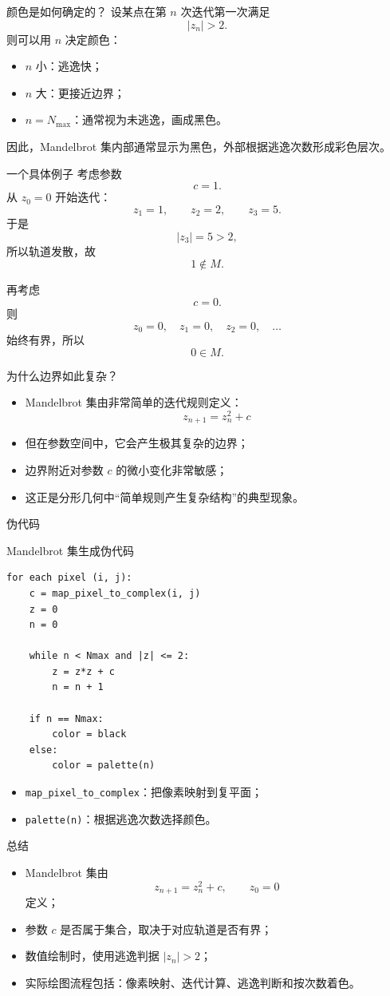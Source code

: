\documentclass[UTF8]{ctexbeamer}
\begin{document}
\begin{frame}{颜色是如何确定的？}
设某点在第 \(n\) 次迭代第一次满足
\[
|z_n|>2.
\]
则可以用 \(n\) 决定颜色：

\begin{itemize}
    \item \(n\) 小：逃逸快；
    \item \(n\) 大：更接近边界；
    \item \(n=N_{\max}\)：通常视为未逃逸，画成黑色。
\end{itemize}

\medskip
因此，Mandelbrot 集内部通常显示为黑色，外部根据逃逸次数形成彩色层次。
\end{frame}

\begin{frame}{一个具体例子}
考虑参数
\[
c=1.
\]
从 \(z_0=0\) 开始迭代：
\[
z_1=1,\qquad z_2=2,\qquad z_3=5.
\]
于是
\[
|z_3|=5>2,
\]
所以轨道发散，故
\[
1 \notin M.
\]

\medskip
再考虑
\[
c=0.
\]
则
\[
z_0=0,\quad z_1=0,\quad z_2=0,\quad \dots
\]
始终有界，所以
\[
0 \in M.
\]
\end{frame}

\begin{frame}{为什么边界如此复杂？}
\begin{itemize}
    \item Mandelbrot 集由非常简单的迭代规则定义：
    \[
    z_{n+1}=z_n^2+c
    \]
    \item 但在参数空间中，它会产生极其复杂的边界；
    \item 边界附近对参数 \(c\) 的微小变化非常敏感；
    \item 这正是分形几何中“简单规则产生复杂结构”的典型现象。
\end{itemize}
\end{frame}

\begin{frame}[fragile]{伪代码}
\small
\begin{block}{Mandelbrot 集生成伪代码}
\begin{verbatim}
for each pixel (i, j):
    c = map_pixel_to_complex(i, j)
    z = 0
    n = 0

    while n < Nmax and |z| <= 2:
        z = z*z + c
        n = n + 1

    if n == Nmax:
        color = black
    else:
        color = palette(n)
\end{verbatim}
\end{block}

\begin{itemize}
    \item \texttt{map\_pixel\_to\_complex}：把像素映射到复平面；
    \item \texttt{palette(n)}：根据逃逸次数选择颜色。
\end{itemize}
\end{frame}

\begin{frame}{总结}
\begin{itemize}
    \item Mandelbrot 集由
    \[
    z_{n+1}=z_n^2+c,\qquad z_0=0
    \]
    定义；
    \item 参数 \(c\) 是否属于集合，取决于对应轨道是否有界；
    \item 数值绘制时，使用逃逸判据 \(|z_n|>2\)；
    \item 实际绘图流程包括：像素映射、迭代计算、逃逸判断和按次数着色。
\end{itemize}
\end{frame}
\end{document}
